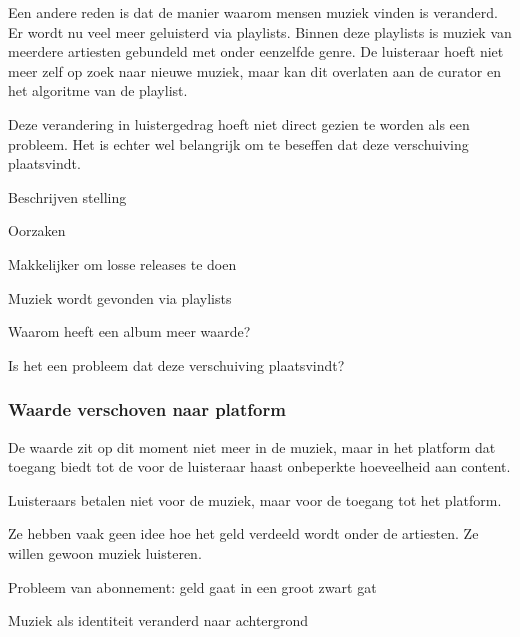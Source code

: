 Een andere reden is dat de manier waarom mensen muziek vinden is veranderd. Er wordt nu veel meer geluisterd via playlists. Binnen deze playlists is muziek van meerdere artiesten gebundeld met onder eenzelfde genre. De luisteraar hoeft niet meer zelf op zoek naar nieuwe muziek, maar kan dit overlaten aan de curator en het algoritme van de playlist.

Deze verandering in luistergedrag hoeft niet direct gezien te worden als een probleem. Het is echter wel belangrijk om te beseffen dat deze verschuiving plaatsvindt. 

\begin{todolist}
  \item[\done] Beschrijven stelling
  \item[\done] Oorzaken
  \begin{todolist}
    \item[\done] Makkelijker om losse releases te doen
    \item[\done] Muziek wordt gevonden via playlists
  \end{todolist}
  \item Waarom heeft een album meer waarde?
  \item Is het een probleem dat deze verschuiving plaatsvindt?
\end{todolist}

\subsubsection*{Waarde verschoven naar platform}
\begin{quotebox}
De waarde zit op dit moment niet meer in de muziek, maar in het platform dat toegang biedt tot de voor de luisteraar haast onbeperkte hoeveelheid aan content.
\end{quotebox}
\begin{todolist}
  \item Luisteraars betalen niet voor de muziek, maar voor de toegang tot het platform.
  \item Ze hebben vaak geen idee hoe het geld verdeeld wordt onder de artiesten. Ze willen gewoon muziek luisteren.
  \item Probleem van abonnement: geld gaat in een groot zwart gat
  \item Muziek als identiteit veranderd naar achtergrond
\end{todolist}

